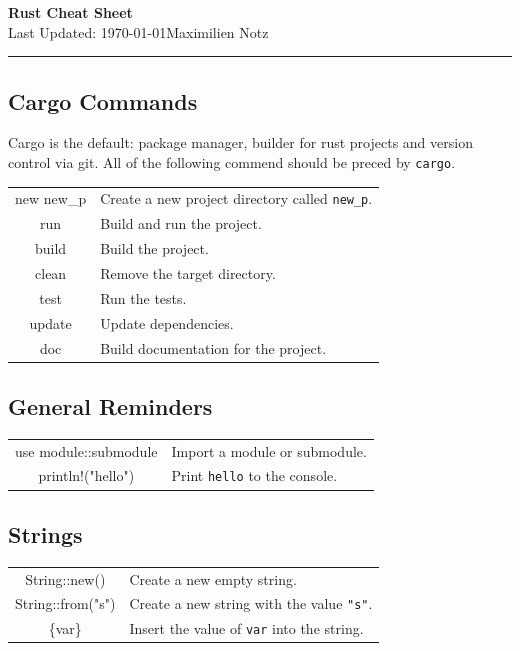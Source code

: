 \documentclass[5pt]{article}
\begin{document}
\begin{center}
    \Large{\textbf{Rust Cheat Sheet}}\\
    \small{Last Updated: \today}\hfill\small{\textcopyright Maximilien Notz \the\year{}}
    \hspace*{-\dimexpr\oddsidemargin+1in\relax}\rule{\paperwidth}{0.4pt}
\end{center}


\begin{multicols}{2}
\setcounter{secnumdepth}{0}

\subsection{Cargo Commands}
Cargo is the default: package manager, builder for rust projects and version control via git. All of the following commend should be preced by \texttt{cargo}.\\
\begin{tabular}{C L}
    new new\_p  & Create a new project directory called \texttt{new\_p}.\\
    run         & Build and run the project.\\
    build       & Build the project.\\
    clean       & Remove the target directory.\\
    test        & Run the tests.\\
    update      & Update dependencies.\\
    doc         & Build documentation for the project.\\
\end{tabular}

\subsection{General Reminders}
\begin{tabular}{C L}
    use module::submodule & Import a module or submodule.\\
    println!("hello") & Print \texttt{hello} to the console.\\
\end{tabular}

\subsection{Strings}
\begin{tabular}{C L}
    String::new()     & Create a new empty string.\\
    String::from("s") & Create a new string with the value \texttt{"s"}.\\
    \{var\}           & Insert the value of \texttt{var} into the string.\\
\end{tabular}


\end{multicols}
\end{document}
